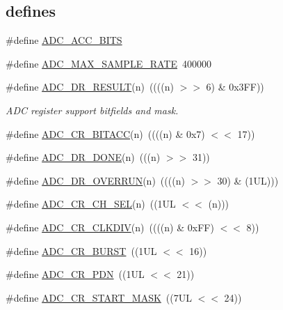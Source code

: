 \subsection*{\textquotesingle{}defines\textquotesingle{}}
\begin{DoxyCompactItemize}
\item 
\#define \hyperlink{group___a_d_c__18_x_x__43_x_x_gaab7b449ba58f52ff6a32dac1ce8977b2}{A\+D\+C\+\_\+\+A\+C\+C\+\_\+B\+I\+TS}
\item 
\#define \hyperlink{group___a_d_c__18_x_x__43_x_x_ga00fa0a2a80f4f4e40c3f9b3bae7ba200}{A\+D\+C\+\_\+\+M\+A\+X\+\_\+\+S\+A\+M\+P\+L\+E\+\_\+\+R\+A\+TE}~400000
\item 
\#define \hyperlink{group___a_d_c__18_x_x__43_x_x_ga6e5fc80635b66a16e87c6f0eea02bb9e}{A\+D\+C\+\_\+\+D\+R\+\_\+\+R\+E\+S\+U\+LT}(n)~((((n) $>$$>$ 6) \& 0x3\+F\+F))
\begin{DoxyCompactList}\small\item\em A\+DC register support bitfields and mask. \end{DoxyCompactList}\item 
\#define \hyperlink{group___a_d_c__18_x_x__43_x_x_ga0fc24dcecfc18634221ff3d9a5b724fd}{A\+D\+C\+\_\+\+C\+R\+\_\+\+B\+I\+T\+A\+CC}(n)~((((n) \& 0x7) $<$$<$ 17))
\item 
\#define \hyperlink{group___a_d_c__18_x_x__43_x_x_ga43dae5912e092ae5cd2455b69b6f4b00}{A\+D\+C\+\_\+\+D\+R\+\_\+\+D\+O\+NE}(n)~(((n) $>$$>$ 31))
\item 
\#define \hyperlink{group___a_d_c__18_x_x__43_x_x_ga48010d662d45810f9a240b29bbca5700}{A\+D\+C\+\_\+\+D\+R\+\_\+\+O\+V\+E\+R\+R\+UN}(n)~((((n) $>$$>$ 30) \& (1\+U\+L)))
\item 
\#define \hyperlink{group___a_d_c__18_x_x__43_x_x_ga3a6629b2190324c0b6abafc4b720df2e}{A\+D\+C\+\_\+\+C\+R\+\_\+\+C\+H\+\_\+\+S\+EL}(n)~((1\+U\+L $<$$<$ (n)))
\item 
\#define \hyperlink{group___a_d_c__18_x_x__43_x_x_gad2327ec652bedf37c800e077cc46d904}{A\+D\+C\+\_\+\+C\+R\+\_\+\+C\+L\+K\+D\+IV}(n)~((((n) \& 0x\+F\+F) $<$$<$ 8))
\item 
\#define \hyperlink{group___a_d_c__18_x_x__43_x_x_gac4274c705620f3ddd5ba7f73249e6248}{A\+D\+C\+\_\+\+C\+R\+\_\+\+B\+U\+R\+ST}~((1\+U\+L $<$$<$ 16))
\item 
\#define \hyperlink{group___a_d_c__18_x_x__43_x_x_ga7474e4ab5695434acbfe8a5fcad35ef0}{A\+D\+C\+\_\+\+C\+R\+\_\+\+P\+DN}~((1\+U\+L $<$$<$ 21))
\item 
\#define \hyperlink{group___a_d_c__18_x_x__43_x_x_gadb696eab756362a8e2dbc5502f8bdeaf}{A\+D\+C\+\_\+\+C\+R\+\_\+\+S\+T\+A\+R\+T\+\_\+\+M\+A\+SK}~((7\+U\+L $<$$<$ 24))
$$
\end{DoxyCompactItemize}
